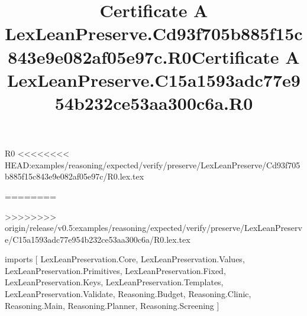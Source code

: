 \begin{lexlean}{R0}
<<<<<<<< HEAD:examples/reasoning/expected/verify/preserve/LexLeanPreserve/Cd93f705b885f15c843e9e082af05e97c/R0.lex.tex
\title{Certificate A LexLeanPreserve.Cd93f705b885f15c843e9e082af05e97c.R0}
========
\title{Certificate A LexLeanPreserve.C15a1593adc77e954b232ce53aa300c6a.R0}
>>>>>>>> origin/release/v0.5:examples/reasoning/expected/verify/preserve/LexLeanPreserve/C15a1593adc77e954b232ce53aa300c6a/R0.lex.tex
\begin{coremodule}
imports [
  LexLeanPreservation.Core,
  LexLeanPreservation.Values,
  LexLeanPreservation.Primitives,
  LexLeanPreservation.Fixed,
  LexLeanPreservation.Keys,
  LexLeanPreservation.Templates,
  LexLeanPreservation.Validate,
  Reasoning.Budget,
  Reasoning.Clinic,
  Reasoning.Main,
  Reasoning.Planner,
  Reasoning.Screening
]


\end{coremodule}
\end{lexlean}
